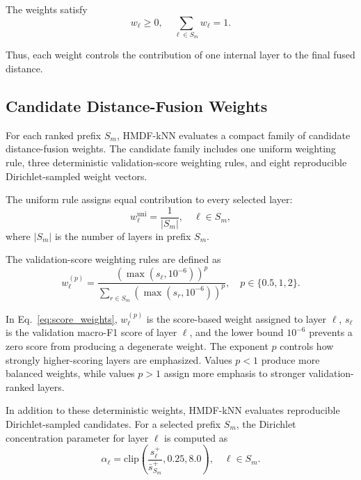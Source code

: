 \documentclass[main.tex]{subfiles}
\begin{document}
The weights satisfy
\begin{equation}
  w_{\ell}\geq 0,
  \quad
  \sum_{\ell\in S_m} w_{\ell}=1.
\end{equation}

Thus, each weight controls the contribution of one internal layer to the final fused distance.

\subsection{Candidate Distance-Fusion Weights}

For each ranked prefix \(S_m\), HMDF-kNN evaluates a compact family of candidate distance-fusion weights. The candidate family includes one uniform weighting rule, three deterministic validation-score weighting rules, and eight reproducible Dirichlet-sampled weight vectors.

The uniform rule assigns equal contribution to every selected layer:
\begin{equation}
  w_{\ell}^{\mathrm{uni}}
  =
  \frac{1}{|S_m|},
  \quad
  \ell \in S_m,
\end{equation}
where \(|S_m|\) is the number of layers in prefix \(S_m\).

The validation-score weighting rules are defined as
\begin{equation}
  w_{\ell}^{(p)}
  =
  \frac{(\max(s_{\ell},10^{-6}))^p}
  {\sum_{r\in S_m}(\max(s_r,10^{-6}))^p},
  \quad
  p\in\{0.5,1,2\}.
  \label{eq:score_weights}
\end{equation}

In Eq.~\eqref{eq:score_weights}, \(w_{\ell}^{(p)}\) is the score-based weight assigned to layer \(\ell\), \(s_{\ell}\) is the validation macro-F1 score of layer \(\ell\), and the lower bound \(10^{-6}\) prevents a zero score from producing a degenerate weight. The exponent \(p\) controls how strongly higher-scoring layers are emphasized. Values \(p<1\) produce more balanced weights, while values \(p>1\) assign more emphasis to stronger validation-ranked layers.

In addition to these deterministic weights, HMDF-kNN evaluates reproducible Dirichlet-sampled candidates. For a selected prefix \(S_m\), the Dirichlet concentration parameter for layer \(\ell\) is computed as
\begin{equation}
  \alpha_{\ell}
  =
  \mathrm{clip}
  \left(
  \frac{s_{\ell}^{+}}
  {\bar{s}_{S_m}^{+}},
  0.25,
  8.0
  \right),
  \quad \ell \in S_m.
  \label{eq:dirichlet_alpha}
\end{equation}
\end{document}
